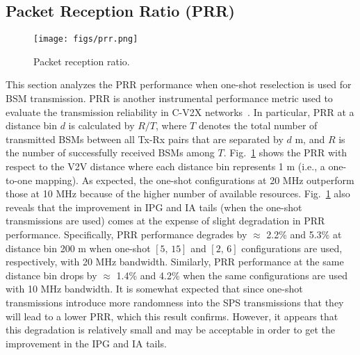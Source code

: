 \documentclass[conference]{IEEEtran}
\begin{document}
\subsection{Packet Reception Ratio (PRR)}\label{sec_sub_prr}
\begin{figure}
  \begin{center}
  \texttt{[image: figs/prr.png]}
  \caption{Packet reception ratio.}\label{fig_prr}
  \vspace{-.3in}
  \end{center}
\end{figure}
This section analyzes the PRR performance when one-shot reselection is used for BSM transmission. PRR is another instrumental performance metric used to evaluate the transmission reliability in C-V2X networks~\cite{3gpp37885}. In particular, PRR at a distance bin $d$ is calculated by $R/T$, where $T$ denotes the total number of transmitted BSMs between all Tx-Rx pairs that are separated by $d$ m, and $R$ is the number of successfully received BSMs among $T$. Fig.~\ref{fig_prr} shows the PRR with respect to the V2V distance where each distance bin represents 1 m (i.e., a one-to-one mapping). As expected, the one-shot configurations at 20 MHz outperform those at 10 MHz because of the higher number of available resources. Fig.~\ref{fig_prr} also reveals that the improvement in IPG and IA tails (when the one-shot transmissions are used) comes at the expense of slight degradation in PRR performance. Specifically, PRR performance degrades by $\approx$ 2.2\% and 5.3\% at distance bin 200 m when one-shot $[5,\,15]$ and $[2,\,6]$ configurations are used, respectively, with 20 MHz bandwidth. Similarly, PRR performance at the same distance bin drops by $\approx$ 1.4\% and 4.2\% when the same configurations are used with 10 MHz bandwidth. It is somewhat expected that since one-shot transmissions introduce more randomness into the SPS transmissions that they will lead to a lower PRR, which this result confirms. However, it appears that this degradation is relatively small and may be acceptable in order to get the improvement in the IPG and IA tails.
\end{document}
